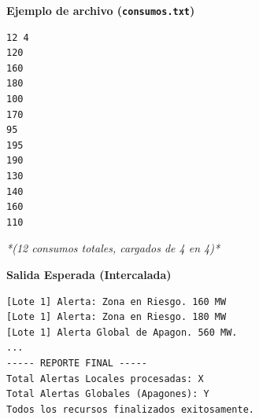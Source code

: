 \documentclass[12pt,a4paper]{article}
\begin{document}
\vspace{0.4cm}
\noindent
\begin{minipage}[t]{0.48\textwidth}
\textbf{Ejemplo de archivo (\texttt{consumos.txt})}
\begin{lstlisting}[numbers=none, frame=single, backgroundcolor=\color{white}]
12 4
120
160
180
100
170
95
195
190
130
140
160
110
\end{lstlisting}
\vspace{0.1cm}
\textit{*(12 consumos totales, cargados de 4 en 4)*}
\end{minipage}
\hfill
\begin{minipage}[t]{0.48\textwidth}
\textbf{Salida Esperada (Intercalada)}
\begin{lstlisting}[numbers=none, frame=single, backgroundcolor=\color{white}]
[Lote 1] Alerta: Zona en Riesgo. 160 MW
[Lote 1] Alerta: Zona en Riesgo. 180 MW
[Lote 1] Alerta Global de Apagon. 560 MW.
...
----- REPORTE FINAL -----
Total Alertas Locales procesadas: X
Total Alertas Globales (Apagones): Y
Todos los recursos finalizados exitosamente.
\end{lstlisting}
\end{minipage}
\end{document}
